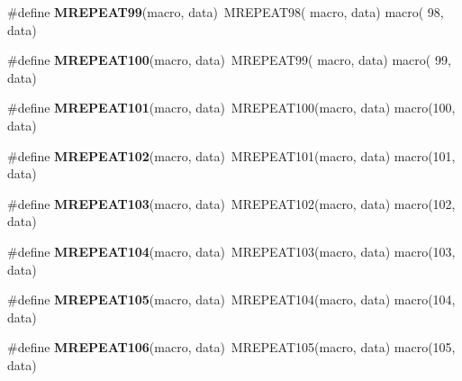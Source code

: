 \begin{DoxyCompactItemize}
\item 
\hypertarget{group__group__xmega__utils__mrepeat_ga6f0bcd4130a9efc978ec43537d0ccb57}{\#define {\bfseries M\-R\-E\-P\-E\-A\-T99}(macro, data)~M\-R\-E\-P\-E\-A\-T98( macro, data)   macro( 98, data)}\label{group__group__xmega__utils__mrepeat_ga6f0bcd4130a9efc978ec43537d0ccb57}

\item 
\hypertarget{group__group__xmega__utils__mrepeat_ga2735125552e869ea1e49fa52ed6e175c}{\#define {\bfseries M\-R\-E\-P\-E\-A\-T100}(macro, data)~M\-R\-E\-P\-E\-A\-T99( macro, data)   macro( 99, data)}\label{group__group__xmega__utils__mrepeat_ga2735125552e869ea1e49fa52ed6e175c}

\item 
\hypertarget{group__group__xmega__utils__mrepeat_gae02508a50d4516010d562970b2466731}{\#define {\bfseries M\-R\-E\-P\-E\-A\-T101}(macro, data)~M\-R\-E\-P\-E\-A\-T100(macro, data)   macro(100, data)}\label{group__group__xmega__utils__mrepeat_gae02508a50d4516010d562970b2466731}

\item 
\hypertarget{group__group__xmega__utils__mrepeat_ga2418759d7f3f1ae57feab4b703f99662}{\#define {\bfseries M\-R\-E\-P\-E\-A\-T102}(macro, data)~M\-R\-E\-P\-E\-A\-T101(macro, data)   macro(101, data)}\label{group__group__xmega__utils__mrepeat_ga2418759d7f3f1ae57feab4b703f99662}

\item 
\hypertarget{group__group__xmega__utils__mrepeat_ga5497848f0c9b8f33dbbad94bb98a8a8b}{\#define {\bfseries M\-R\-E\-P\-E\-A\-T103}(macro, data)~M\-R\-E\-P\-E\-A\-T102(macro, data)   macro(102, data)}\label{group__group__xmega__utils__mrepeat_ga5497848f0c9b8f33dbbad94bb98a8a8b}

\item 
\hypertarget{group__group__xmega__utils__mrepeat_ga22151fc326d5feb28b754cbc581902e1}{\#define {\bfseries M\-R\-E\-P\-E\-A\-T104}(macro, data)~M\-R\-E\-P\-E\-A\-T103(macro, data)   macro(103, data)}\label{group__group__xmega__utils__mrepeat_ga22151fc326d5feb28b754cbc581902e1}

\item 
\hypertarget{group__group__xmega__utils__mrepeat_ga8df0585384d0052a9a2009876cd18459}{\#define {\bfseries M\-R\-E\-P\-E\-A\-T105}(macro, data)~M\-R\-E\-P\-E\-A\-T104(macro, data)   macro(104, data)}\label{group__group__xmega__utils__mrepeat_ga8df0585384d0052a9a2009876cd18459}

\item 
\hypertarget{group__group__xmega__utils__mrepeat_ga65c66d814f582f426c18794de01f4475}{\#define {\bfseries M\-R\-E\-P\-E\-A\-T106}(macro, data)~M\-R\-E\-P\-E\-A\-T105(macro, data)   macro(105, data)}\label{group__group__xmega__utils__mrepeat_ga65c66d814f582f426c18794de01f4475}


\end{DoxyCompactItemize}
